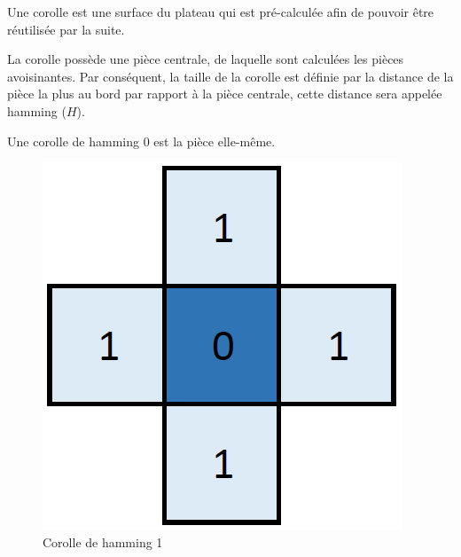 	Une corolle est une surface du plateau qui est pré-calculée afin de pouvoir être réutilisée par la suite.
		
	La corolle possède une pièce centrale, de laquelle sont calculées les pièces avoisinantes. Par conséquent, la taille de la corolle est définie par la distance de la pièce la plus au bord par rapport à la pièce centrale, cette distance sera appelée hamming ($H$).
	
	\begin{rem}
		Une corolle de hamming 0 est la pièce elle-même.
	\end{rem}
		
	\begin{figure}[H]
		\begin{minipage}[t]{0.33\textwidth}
			\includegraphics[width=\linewidth]{images/corolle_hamming_1.png}
			\caption{Corolle de hamming 1}\label{fig:corolle_hamming_1}
		\end{minipage}\hfill
		\begin{minipage}[t]{0.33\textwidth}

\end{minipage}
\end{figure}
